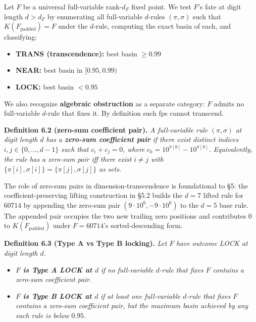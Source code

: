 \documentclass[11pt,letterpaper]{article}
\providecommand{\tightlist}{%
  \setlength{\itemsep}{0pt}\setlength{\parskip}{0pt}}
\theoremstyle{paperstyle}
\theoremstyle{paperstyledef}
\theoremstyle{paperstylerem}
\begin{document}
Let \(F\) be a universal full-variable rank-\(d_F\) fixed point. We test
\(F\)'s fate at digit length \(d > d_F\) by enumerating all
full-variable \(d\)-rules \((\pi, \sigma)\) such that
\(K(F_{\text{padded}}) = F\) under the \(d\)-rule, computing the exact
basin of each, and classifying:

\begin{itemize}
\tightlist
\item
  \textbf{TRANS (transcendence):} best basin \(\geq 0.99\)
\item
  \textbf{NEAR:} best basin in \([0.95, 0.99)\)
\item
  \textbf{LOCK:} best basin \(< 0.95\)
\end{itemize}

We also recognize \textbf{algebraic obstruction} as a separate category:
\(F\) admits no full-variable \(d\)-rule that fixes it. By definition
such fps cannot transcend.

\textbf{Definition 6.2 (zero-sum coefficient pair).} \emph{A
full-variable rule \((\pi, \sigma)\) at digit length \(d\) has a
\textbf{zero-sum coefficient pair} if there exist distinct indices
\(i, j \in \{0, \ldots, d-1\}\) such that \(c_i + c_j = 0\), where
\(c_k = 10^{\pi[k]} - 10^{\sigma[k]}\). Equivalently, the rule has a
zero-sum pair iff there exist \(i \neq j\) with
\(\{\pi[i], \sigma[i]\} = \{\pi[j], \sigma[j]\}\) as sets.}

The role of zero-sum pairs in dimension-transcendence is foundational to
§5: the coefficient-preserving lifting construction in §5.2 builds the
\(d = 7\) lifted rule for \(60714\) by appending the zero-sum pair
\((9 \cdot 10^6, -9 \cdot 10^6)\) to the \(d = 5\) base rule. The
appended pair occupies the two new trailing zero positions and
contributes \(0\) to \(K(F_{\text{padded}})\) under \(F = 60714\)'s
sorted-descending form.

\textbf{Definition 6.3 (Type A vs Type B locking).} \emph{Let \(F\) have
outcome LOCK at digit length \(d\).}

\begin{itemize}
\tightlist
\item
  \textbf{\emph{\(F\) is Type A LOCK at \(d\)}} \emph{if no
  full-variable \(d\)-rule that fixes \(F\) contains a zero-sum
  coefficient pair.}
\item
  \textbf{\emph{\(F\) is Type B LOCK at \(d\)}} \emph{if at least one
  full-variable \(d\)-rule that fixes \(F\) contains a zero-sum
  coefficient pair, but the maximum basin achieved by any such rule is
  below \(0.95\).}
\end{itemize}
\end{document}
